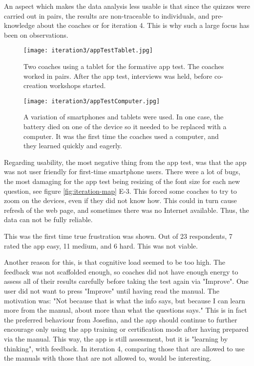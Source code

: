   An aspect which makes the data analysis less usable is that since the quizzes were carried out in pairs, the results are non-traceable to individuals, and pre-knowledge about the coaches or for iteration 4. This is why such a large focus has been on observations.

  \begin{figure}[h]
    \centering
    \texttt{[image: iteration3/appTestTablet.jpg]}
    \caption{Two coaches using a tablet for the formative app test. The coaches worked in pairs. After the app test, interviews was held, before co-creation workshops started.}
    \label{fig:tabletTest}
  \end{figure}

  \begin{figure}[h]
    \centering
    \texttt{[image: iteration3/appTestComputer.jpg]}
    \caption{A variation of smartphones and tablets were used. In one case, the battery died on one of the device so it needed to be replaced with a computer. It was the first time the coaches used a computer, and they learned quickly and eagerly.}
    \label{fig:computerTest}
  \end{figure}

  Regarding usability, the most negative thing from the app test, was that the app was not user friendly for first-time smartphone users. There were a lot of bugs, the most damaging for the app test being resizing of the font size for each new question, see figure \ref{fig:iteration-map} E-3. This forced some coaches to try to zoom on the devices, even if they did not know how. This could in turn cause refresh of the web page, and sometimes there was no Internet available. Thus, the data can not be fully reliable.

  This was the first time true frustration was shown. Out of 23 respondents, 7 rated the app easy, 11 medium, and 6 hard. This was not viable.

  Another reason for this, is that cognitive load seemed to be too high. The feedback was not scaffolded enough, so coaches did not have enough energy to assess all of their results carefully before taking the test again via "Improve". One user did not want to press "Improve" until having read the manual. The motivation was: "Not because that is what the info says, but because I can learn more from the manual, about more than what the questions says." This is in fact the preferred behaviour from Josefina, and the app should continue to further encourage only using the app training or certification mode after having prepared via the manual. This way, the app is still assessment, but it is "learning by thinking", with feedback. In iteration 4, comparing those that are allowed to use the manuals with those that are not allowed to, would be interesting.

